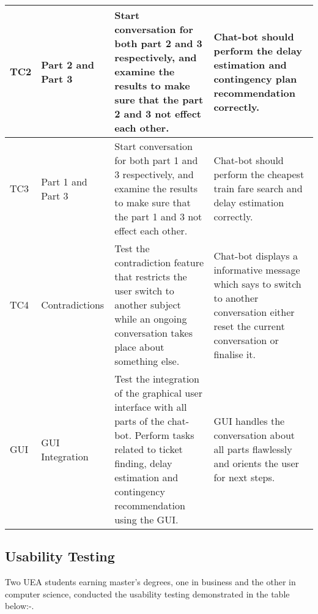 \begin{longtable}{|p{2cm}|p{4cm}|p{4cm}|p{4cm}|}
    TC2 & Part 2 and Part 3 & Start conversation for both part 2 and 3 respectively, and examine the results to make sure that the part 2 and 3 not effect each other. & Chat-bot should perform the delay estimation and contingency plan recommendation correctly. \\
    \hline
    
    TC3 & Part 1 and Part 3 & Start conversation for both part 1 and 3 respectively, and examine the results to make sure that the part 1 and 3 not effect each other. &  Chat-bot should perform the cheapest train fare search and delay estimation correctly. \\
    \hline
    
    TC4 & Contradictions & Test the contradiction feature that restricts the user switch to another subject while an ongoing conversation takes place about something else. & Chat-bot displays a informative message which says to switch to another conversation either reset the current conversation or finalise it. \\
    \hline
    
    GUI & GUI Integration & Test the integration of the graphical user interface with all parts of the chat-bot. Perform tasks related to ticket finding, delay estimation and contingency recommendation using the GUI. & GUI handles the conversation about all parts flawlessly and orients the user for next steps.  \\
    \hline
    
    \end{longtable}
    
\subsection{Usability Testing}
Two UEA students earning master's degrees, one in business and the other in computer science, conducted the usability testing demonstrated in the table below:-. 

